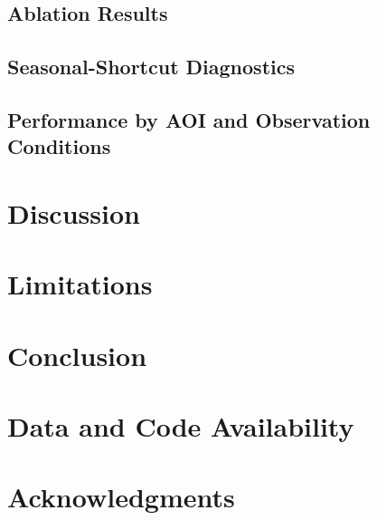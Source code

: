 \documentclass[11pt]{article}
\begin{document}
\subsection{Ablation Results}

\subsection{Seasonal-Shortcut Diagnostics}

\subsection{Performance by AOI and Observation Conditions}

\section{Discussion}
\label{sec:discussion}


\section{Limitations}
\label{sec:limitations}


\section{Conclusion}
\label{sec:conclusion}


\section*{Data and Code Availability}

\section*{Acknowledgments}
\end{document}
